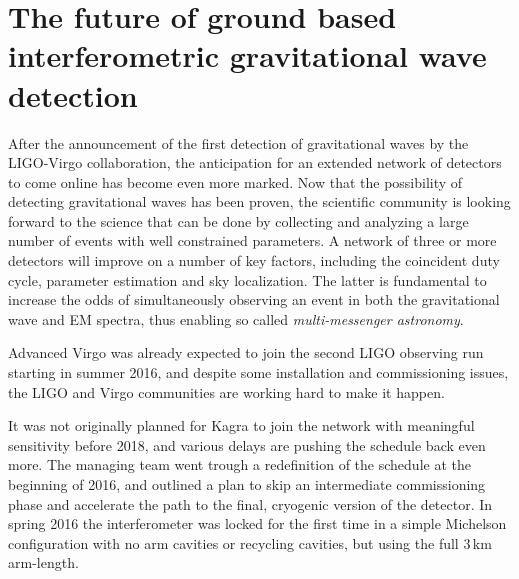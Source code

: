 \section{The future of ground based interferometric gravitational wave detection}\label{subsec:future}

After the announcement of the first detection of gravitational waves by the LIGO-Virgo collaboration, the anticipation for an extended network of detectors to come online has become even more marked.
Now that the possibility of detecting gravitational waves has been proven, the scientific community is looking forward to the science that can be done by collecting and analyzing a large number of events with well constrained parameters.
A network of three or more detectors will improve on a number of key factors, including the coincident duty cycle, parameter estimation and sky localization. The latter is fundamental to increase the odds of simultaneously observing an event in both the gravitational wave and EM spectra, thus enabling so called \textit{multi-messenger astronomy}.

Advanced Virgo was already expected to join the second LIGO observing run starting in summer 2016, and despite some installation and commissioning issues, the LIGO and Virgo communities are working hard to make it happen.

It was not originally planned for Kagra to join the network with meaningful sensitivity before 2018, and various delays are pushing the schedule back even more. 
The managing team went trough a redefinition of the schedule at the beginning of 2016, and outlined a plan to skip an intermediate commissioning phase and accelerate the path to the final, cryogenic version of the detector. 
In spring 2016 the interferometer was locked for the first time in a simple Michelson configuration with no arm cavities or recycling cavities, but using the full 3\,km arm-length.

